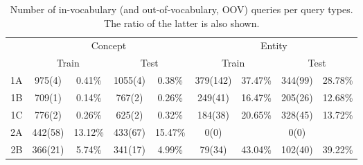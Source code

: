 \documentclass[11pt,a4paper]{article}
\begin{document}
\begin{table*}
	\centering
	\begin{tabular}{r|cccc|cccc}
    \toprule
		& \multicolumn{4}{c|}{Concept} & \multicolumn{4}{c}{Entity} \\
    & \multicolumn{2}{c}{Train} &
     \multicolumn{2}{c|}{Test} &
     \multicolumn{2}{c}{Train} &
     \multicolumn{2}{c}{Test} \\
     \midrule
1A & 975(4) & 0.41\%	&1055(4) & 0.38\%	&379(142) & 37.47\%	&344(99) & 28.78\% \\
1B & 709(1) & 0.14\%	&767(2) & 0.26\%	&249(41) & 16.47\%	&205(26) & 12.68\% \\
1C & 776(2) & 0.26\%	&625(2) & 0.32\%	&184(38) & 20.65\%	&328(45) & 13.72\% \\
2A & 442(58) & 13.12\%	&433(67) & 15.47\%	&0(0) & 	& 0(0) & \\
2B & 366(21) & 5.74\%	&341(17) & 4.99\%	&79(34) & 43.04\%	&102(40) & 39.22\% \\
\bottomrule
	\end{tabular}
  \caption{Number of in-vocabulary (and out-of-vocabulary, OOV) queries per query
  types.  The ratio of the latter is also shown.}
\label{table:coverage}
\end{table*}
\end{document}
